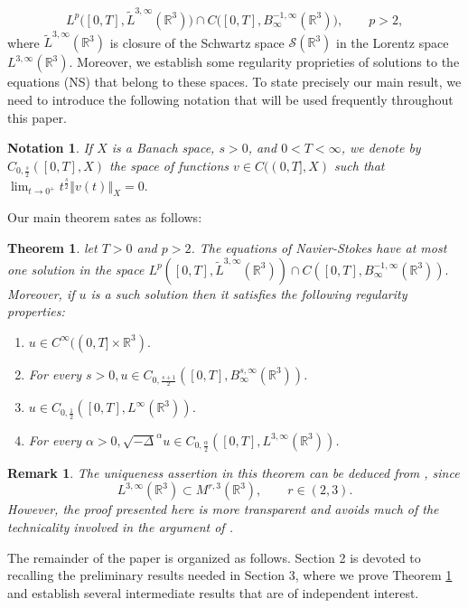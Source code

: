 \documentclass[11pt]{amsart}%
\theoremstyle{plain}
\numberwithin{equation}{section}
\newtheorem{theorem}{Theorem}[section]
\newtheorem{remark}{Remark}[section]
\newtheorem{notation}{Notation}
\begin{document}
$$L^p\bigl([0,T],\widetilde{L}^{3,\infty}(\mathbb{R}^3)\bigr)
\cap
C\bigl([0,T],B^{-1,\infty}_{\infty}(\mathbb{R}^3)\bigr),
\qquad p>2,$$
where $\widetilde{L}^{3,\infty}(\mathbb{R}^3)$  is
closure of the Schwartz space $\mathcal{S}(\mathbb{R}^3)$ in the Lorentz space $L^{3,\infty}(\mathbb{R}^3)$. Moreover, we establish some regularity proprieties of solutions to the equations (NS) that belong to these spaces. To state precisely our main result, we need to introduce the following notation that will be used frequently throughout this paper.
\begin{notation}
 If $X$ is a Banach space, $s>0$, and $0<T<\infty$, we denote by $C_{0,\frac{s}{2}}([0,T],X)$ the space of functions $v\in C((0,T],X)$ such that $\lim_{t\to 0^+}t^{\frac{s}{2}}\left\Vert v(t)\right\Vert_X=0.$
\end{notation}
Our main theorem sates as follows:
\begin{theorem}\label{main}
let $T>0$ and $p>2$. The equations of Navier-Stokes have at most one solution  in the space $L^p([0,T],\tilde{L}^{3,\infty}(\mathbb{R}^3))\cap C([0,T],B^{-1,\infty}_\infty(\mathbb{R}^3)).$ Moreover, if $u$ is a such solution then it satisfies the following regularity properties:
\begin{enumerate}
    \item $u\in C^\infty((0,T]\times \mathbb{R}^3).$
    \item For every $s>0, u\in C_{0,\frac{s+1}{2}}([0,T],B^{s,\infty}_\infty(\mathbb{R}^3))$.
    \item $ u\in C_{0,\frac{1}{2}}([0,T],L^\infty(\mathbb{R}^3))$.
    \item For every $\alpha>0, \sqrt{-\Delta}^\alpha u\in C_{0,\frac{\alpha}{2}}([0,T],L^{3,\infty}(\mathbb{R}^3))$.
\end{enumerate}
\end{theorem}
\begin{remark}
The uniqueness assertion in this theorem can be deduced from \cite[Theorem 1.3]{May2}, since
\[
L^{3,\infty}(\mathbb{R}^3)\subset M^{r,3}(\mathbb{R}^3),
\qquad r\in(2,3).
\]
However, the proof presented here is more transparent  and avoids much of the technicality involved in the argument of \cite{May2}.
\end{remark}
The remainder of the paper is organized as follows. Section 2 is devoted to recalling the preliminary results needed in Section 3, where we prove Theorem \ref{main} and establish several intermediate results that are of independent interest.
\end{document}
